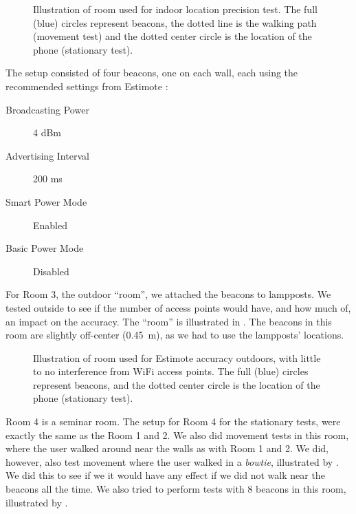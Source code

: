 \begin{figure}[!htb]
    \centering
    
    \caption{Illustration of room used for indoor location precision test. The full (blue) circles represent beacons, the dotted line is the walking path (movement test) and the dotted center circle is the location of the phone (stationary test).}
    \label{fig:precisiontest:illustration}
\end{figure}

The setup consisted of four beacons, one on each wall, 
each using the recommended settings from Estimote \cite{estimote:settings}:
\begin{description}
    \item[Broadcasting Power]{4 dBm}
    \item[Advertising Interval]{200 ms}
    \item[Smart Power Mode]{Enabled}
    \item[Basic Power Mode]{Disabled}
\end{description}

For Room 3, the outdoor ``room'',
we attached the beacons to lampposts. 
We tested outside to see if the number of access points would have, and how much of, 
an impact on the accuracy. 
The ``room'' is illustrated in . 
The beacons in this room are slightly off-center (\SI{0.45}{\meter}), 
as we had to use the lampposts' locations. 

\begin{figure}[!htb]
    \centering
    
    \caption{Illustration of room used for Estimote accuracy outdoors, with little to no interference from WiFi access points. The full (blue) circles represent beacons, and the dotted center circle is the location of the phone (stationary test).}
    \label{fig:outdoortest}
\end{figure}

Room 4 is a seminar room. 
The setup for Room 4 for the stationary tests,
were exactly the same as the Room 1 and 2. 
We also did movement tests in this room, 
where the user walked around near the walls as with Room 1 and 2. 
We did, however, also test movement where the user walked in a \emph{bowtie},
illustrated by . 
We did this to see if we it would have any effect if we did not walk near the beacons all the time. 
We also tried to perform tests with \num{8} beacons in this room, 
illustrated by . 

